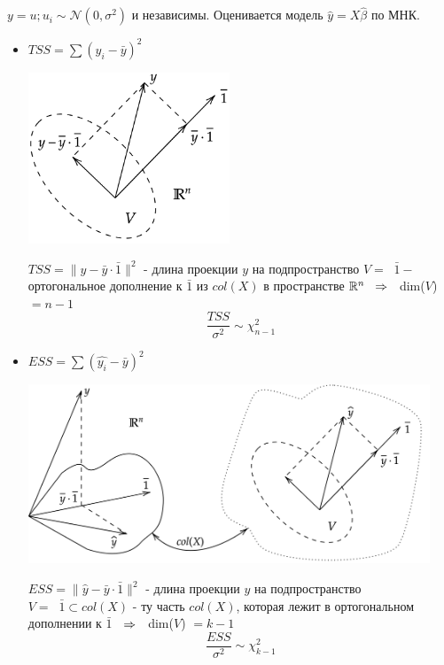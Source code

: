 \documentclass[12pt]{article} %
\theoremstyle{definition} %
\DeclareMathOperator{\Linp}{Lin^{\perp}}
\begin{document}
\begin{exerc}
    $y = u; u_i \sim \mathcal{N}(0,\sigma^2)$ и независимы. Оценивается модель $\hat y = X\hat\beta$ по МНК. \par
    \addlinespace
    \begin{itemize}
        \item $TSS = \sum (y_i - \bar y)^2$
            \begin{center}
               \includegraphics[width=6cm]{images/pic07_06.png}
            \end{center}
            $TSS = \lVert y - \bar y \cdot \bar 1 \rVert^2$ - длина проекции $y$ на подпространство $V = \Linp \bar 1 -$ ортогональное дополнение к $\bar 1$ из $col(X)$ в пространстве $\mathbb{R}^n \hspace{0.2cm} \Rightarrow \hspace{0.2cm}$  dim($V$) $=n-1$ 
            \[
            \frac{TSS}{\sigma^2} \sim \mathcal{\chi}_{n-1}^2
            \]
        \item $ESS = \sum (\hat {y_i} - \bar y)^2$
            \begin{center}
               \includegraphics[width=12cm]{images/pic08_06.png}
            \end{center}
            $ESS = \lVert \hat y - \bar y \cdot \bar 1 \rVert^2$ - длина проекции $y$ на подпространство $V = \Linp \bar 1 \subset col(X)$  - ту часть $col(X)$, которая лежит в ортогональном дополнении к $\bar 1$ $\hspace{0.2cm} \Rightarrow \hspace{0.2cm}$  dim($V$) $=k-1$ 
            \[
            \frac{ESS}{\sigma^2} \sim \mathcal{\chi}_{k-1}^2
            \]
    \end{itemize}
\end{exerc}
\end{document}

